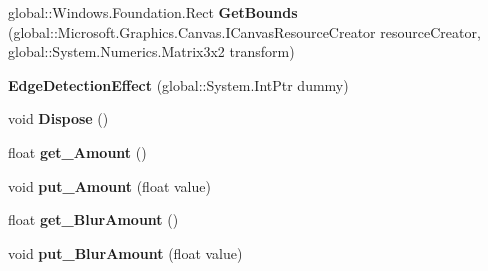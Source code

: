 \begin{DoxyCompactItemize}
\item 
\mbox{\label{class_microsoft_1_1_graphics_1_1_canvas_1_1_effects_1_1_edge_detection_effect_a633113ef50a9947d0a1e0964566587d8}} 
global\+::\+Windows.\+Foundation.\+Rect {\bfseries Get\+Bounds} (global\+::\+Microsoft.\+Graphics.\+Canvas.\+I\+Canvas\+Resource\+Creator resource\+Creator, global\+::\+System.\+Numerics.\+Matrix3x2 transform)
\item 
\mbox{\label{class_microsoft_1_1_graphics_1_1_canvas_1_1_effects_1_1_edge_detection_effect_a9542f96d28e629e75fc7549550e42caf}} 
{\bfseries Edge\+Detection\+Effect} (global\+::\+System.\+Int\+Ptr dummy)
\item 
\mbox{\label{class_microsoft_1_1_graphics_1_1_canvas_1_1_effects_1_1_edge_detection_effect_a4ef78a65aa6c4075fd46d5020462a100}} 
void {\bfseries Dispose} ()
\item 
\mbox{\label{class_microsoft_1_1_graphics_1_1_canvas_1_1_effects_1_1_edge_detection_effect_abb9b39bb3406ac6a4e812bd40512b749}} 
float {\bfseries get\+\_\+\+Amount} ()
\item 
\mbox{\label{class_microsoft_1_1_graphics_1_1_canvas_1_1_effects_1_1_edge_detection_effect_a35679bc6700b81e40b2e61ff0a065a2e}} 
void {\bfseries put\+\_\+\+Amount} (float value)
\item 
\mbox{\label{class_microsoft_1_1_graphics_1_1_canvas_1_1_effects_1_1_edge_detection_effect_ae48b3056466454ff45406d2d9be05f6b}} 
float {\bfseries get\+\_\+\+Blur\+Amount} ()
\item 
\mbox{\label{class_microsoft_1_1_graphics_1_1_canvas_1_1_effects_1_1_edge_detection_effect_a73881826da0680e80bc3fabfb027cfd7}} 
void {\bfseries put\+\_\+\+Blur\+Amount} (float value)

\end{DoxyCompactItemize}

